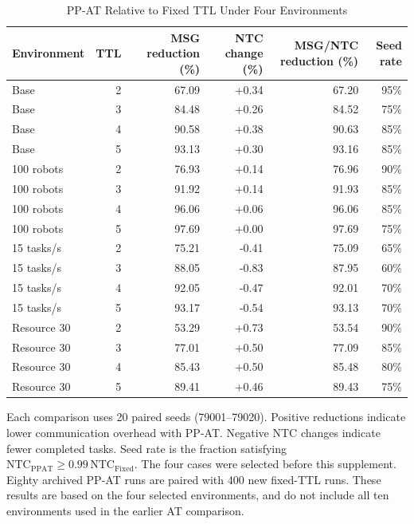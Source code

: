 \begin{table}[htb]
\centering
\caption{PP-AT Relative to Fixed TTL Under Four Environments}
\label{tab:fixed_robustness}
\begingroup\small\setlength{\tabcolsep}{4pt}
\begin{tabular*}{\linewidth}{@{\extracolsep{\fill}}lrrrrr@{}}
\toprule
Environment & TTL & MSG reduction (\%) & NTC change (\%) & MSG/NTC reduction (\%) & Seed rate \\
\midrule
Base & 2 & 67.09 & +0.34 & 67.20 & 95\% \\
Base & 3 & 84.48 & +0.26 & 84.52 & 75\% \\
Base & 4 & 90.58 & +0.38 & 90.63 & 85\% \\
Base & 5 & 93.13 & +0.30 & 93.16 & 85\% \\
100 robots & 2 & 76.93 & +0.14 & 76.96 & 90\% \\
100 robots & 3 & 91.92 & +0.14 & 91.93 & 85\% \\
100 robots & 4 & 96.06 & +0.06 & 96.06 & 85\% \\
100 robots & 5 & 97.69 & +0.00 & 97.69 & 75\% \\
15 tasks/s & 2 & 75.21 & -0.41 & 75.09 & 65\% \\
15 tasks/s & 3 & 88.05 & -0.83 & 87.95 & 60\% \\
15 tasks/s & 4 & 92.05 & -0.47 & 92.01 & 70\% \\
15 tasks/s & 5 & 93.17 & -0.54 & 93.13 & 70\% \\
Resource 30 & 2 & 53.29 & +0.73 & 53.54 & 90\% \\
Resource 30 & 3 & 77.01 & +0.50 & 77.09 & 85\% \\
Resource 30 & 4 & 85.43 & +0.50 & 85.48 & 80\% \\
Resource 30 & 5 & 89.41 & +0.46 & 89.43 & 75\% \\
\bottomrule
\end{tabular*}
\par\smallskip
\begin{minipage}{\linewidth}\footnotesize
Each comparison uses 20 paired seeds (79001--79020). Positive reductions indicate lower communication overhead with PP-AT. Negative NTC changes indicate fewer completed tasks. Seed rate is the fraction satisfying $\mathrm{NTC}_{\mathrm{PPAT}}\geq0.99\,\mathrm{NTC}_{\mathrm{Fixed}}$. The four cases were selected before this supplement. Eighty archived PP-AT runs are paired with 400 new fixed-TTL runs. These results are based on the four selected environments, and do not include all ten environments used in the earlier AT comparison.
\end{minipage}
\endgroup
\end{table}

